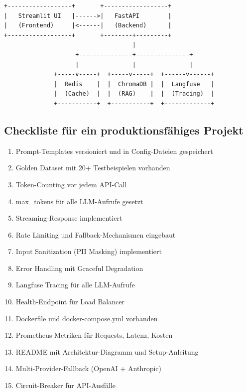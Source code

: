\begin{verbatim}
+------------------+       +------------------+
|   Streamlit UI   |------>|   FastAPI        |
|   (Frontend)     |<------|   (Backend)      |
+------------------+       +--------+---------+
                                    |
                    +---------------+---------------+
                    |               |               |
              +-----v-----+  +-----v-----+  +------v------+
              |  Redis    |  |  ChromaDB |  |  Langfuse   |
              |  (Cache)  |  |  (RAG)    |  |  (Tracing)  |
              +-----------+  +-----------+  +-------------+
\end{verbatim}

\subsection*{Checkliste für ein produktionsfähiges Projekt}

\begin{enumerate}[leftmargin=*]
    \item [\ ] Prompt-Templates versioniert und in Config-Dateien gespeichert
    \item [\ ] Golden Dataset mit 20+ Testbeispielen vorhanden
    \item [\ ] Token-Counting vor jedem API-Call
    \item [\ ] max\_tokens für alle LLM-Aufrufe gesetzt
    \item [\ ] Streaming-Response implementiert
    \item [\ ] Rate Limiting und Fallback-Mechanismen eingebaut
    \item [\ ] Input Sanitization (PII Masking) implementiert
    \item [\ ] Error Handling mit Graceful Degradation
    \item [\ ] Langfuse Tracing für alle LLM-Aufrufe
    \item [\ ] Health-Endpoint für Load Balancer
    \item [\ ] Dockerfile und docker-compose.yml vorhanden
    \item [\ ] Prometheus-Metriken für Requests, Latenz, Kosten
    \item [\ ] README mit Architektur-Diagramm und Setup-Anleitung
    \item [\ ] Multi-Provider-Fallback (OpenAI + Anthropic)
    \item [\ ] Circuit-Breaker für API-Ausfälle
\end{enumerate}

